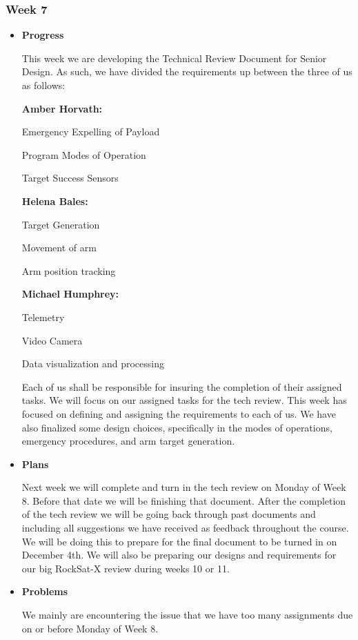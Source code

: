 \subsubsection{Week 7}
\begin{itemize}
\item{
\textbf{Progress}

This week we are developing the Technical Review Document for Senior Design. As such, we have divided the requirements up between the three of us as follows:

\textbf{Amber Horvath:}

    Emergency Expelling of Payload

    Program Modes of Operation

    Target Success Sensors

\textbf{Helena Bales:}

    Target Generation

    Movement of arm

    Arm position tracking

\textbf{Michael Humphrey:}

    Telemetry

    Video Camera

    Data visualization and processing

Each of us shall be responsible for insuring the completion of their assigned tasks. We will focus on our assigned tasks for the tech review. This week has focused on defining and assigning the requirements to each of us. We have also finalized some design choices, specifically in the modes of operations, emergency procedures, and arm target generation.
}
\item{
\textbf{Plans}

Next week we will complete and turn in the tech review on Monday of Week 8. Before that date we will be finishing that document. After the completion of the tech review we will be going back through past documents and including all suggestions we have received as feedback throughout the course. We will be doing this to prepare for the final document to be turned in on December 4th. We will also be preparing our designs and requirements for our big RockSat-X review during weeks 10 or 11.
}
\item{
\textbf{Problems}

We mainly are encountering the issue that we have too many assignments due on or before Monday of Week 8.
}
\end{itemize}

